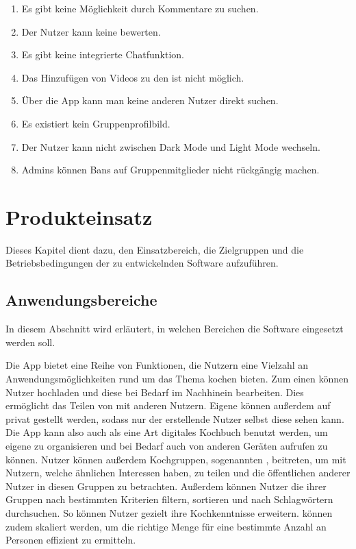 \documentclass[parskip=full]{scrartcl}
\begin{document}
\begin{enumerate}[start=1,label={$\langle$\bfseries RW\arabic*$\rangle$}, leftmargin = 5em, itemsep=4pt, parsep=4pt]
    \item Es gibt keine Möglichkeit  durch Kommentare zu suchen.
    \item Der Nutzer kann keine  bewerten.
    \item Es gibt keine integrierte Chatfunktion.
    \item Das Hinzufügen von Videos zu den  ist nicht möglich.
    \item Über die App kann man keine anderen Nutzer direkt suchen.
    \item Es existiert kein Gruppenprofilbild.
    \item Der Nutzer kann nicht zwischen Dark Mode und Light Mode wechseln.
    \item Admins können Bans auf Gruppenmitglieder nicht rückgängig machen.
\end{enumerate}

\section{Produkteinsatz}
Dieses Kapitel dient dazu, den Einsatzbereich, die Zielgruppen und die Betriebsbedingungen der zu entwickelnden Software aufzuführen.

\subsection{Anwendungsbereiche}
In diesem Abschnitt wird erläutert, in welchen Bereichen die Software eingesetzt werden soll. \par
Die App bietet eine Reihe von Funktionen, die Nutzern eine Vielzahl an Anwendungsmöglichkeiten rund um das Thema kochen bieten.
Zum einen können Nutzer  hochladen und diese bei Bedarf im Nachhinein bearbeiten.
Dies ermöglicht das Teilen von  mit anderen Nutzern. Eigene  können außerdem auf privat gestellt werden, sodass nur der erstellende Nutzer selbst diese sehen kann.
Die App kann also auch als eine Art digitales Kochbuch benutzt werden, um eigene  zu organisieren und bei Bedarf auch von anderen Geräten aufrufen zu können.
Nutzer können außerdem Kochgruppen, sogenannten , beitreten, um  mit Nutzern, welche ähnlichen Interessen haben, zu teilen und die öffentlichen  anderer Nutzer in diesen Gruppen zu betrachten. Außerdem können Nutzer die  ihrer Gruppen nach bestimmten Kriterien filtern, sortieren und nach Schlagwörtern durchsuchen. So können Nutzer gezielt ihre Kochkenntnisse erweitern.
 können zudem skaliert werden, um die richtige Menge für eine bestimmte Anzahl an Personen effizient zu ermitteln.
\end{document}
